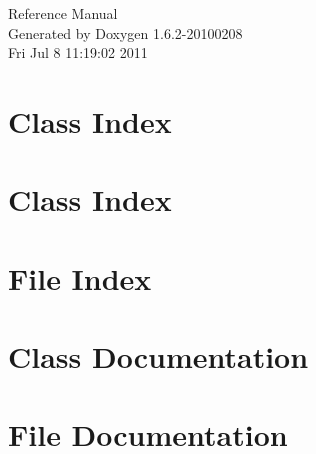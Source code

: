 \documentclass[a4paper]{book}
\begin{document}
\hypersetup{pageanchor=false}
\begin{titlepage}
\vspace*{7cm}
\begin{center}
{\Large Reference Manual}\\
\vspace*{1cm}
{\large Generated by Doxygen 1.6.2-20100208}\\
\vspace*{0.5cm}
{\small Fri Jul 8 11:19:02 2011}\\
\end{center}
\end{titlepage}
\clearemptydoublepage
{}
\tableofcontents
\clearemptydoublepage
{}
\hypersetup{pageanchor=true}
\chapter{Class Index}

\chapter{Class Index}

\chapter{File Index}

\chapter{Class Documentation}























\chapter{File Documentation}



















\printindex
\end{document}
